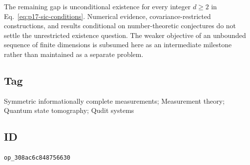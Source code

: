 The remaining gap is unconditional existence for every integer $d\ge2$ in
Eq.~\eqref{eq:p17-sic-conditions}.  Numerical evidence, covariance-restricted
constructions, and results conditional on number-theoretic conjectures do not
settle the unrestricted existence question.  The weaker objective of an
unbounded sequence of finite dimensions is subsumed here as an intermediate
milestone rather than maintained as a separate problem.

\subsection*{Tag}

Symmetric informationally complete measurements; Measurement theory;
Quantum state tomography; Qudit systems

\subsection*{ID}

\texttt{op\_308ac6c848756630}
